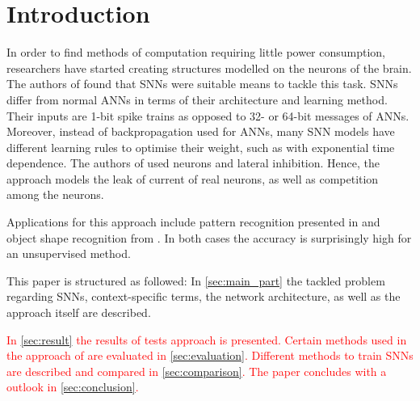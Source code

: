 \section{Introduction}

In order to find methods of computation requiring little power consumption, 
researchers have started creating structures modelled on the neurons of the brain.
The authors of \cite{SNN} found that \acp{SNN} were suitable means to tackle this task.
\acp{SNN} differ from normal \acp{ANN} in terms of their architecture and learning method.
Their inputs are 1-bit spike trains as opposed to 32- or 64-bit messages of \acp{ANN}.
Moreover, instead of backpropagation used for \acp{ANN}, many \ac{SNN} models have different learning rules to optimise their weight, 
such as  with exponential time dependence.
The authors of \cite{SNN} used  neurons and lateral inhibition.
Hence, the approach models the leak of current of real neurons, as well as competition among the neurons.

Applications for this approach include pattern recognition presented in \cite{SNN} and object shape recognition from \cite{object_detection_SNN}.
In both cases the accuracy is surprisingly high for an unsupervised method.

This paper is structured as followed:
In \autoref{sec:main_part} the tackled problem regarding \acp{SNN}, context-specific terms, the network architecture,
 as well as the approach itself are described.

\textcolor{red}{
In \autoref{sec:result} the results of tests approach is presented.
Certain methods used in the approach of \cite{SNN} are evaluated in \autoref{sec:evaluation}.
Different methods to train \acp{SNN} are described and compared in \autoref{sec:comparison}.
The paper concludes with a outlook in \autoref{sec:conclusion}.}